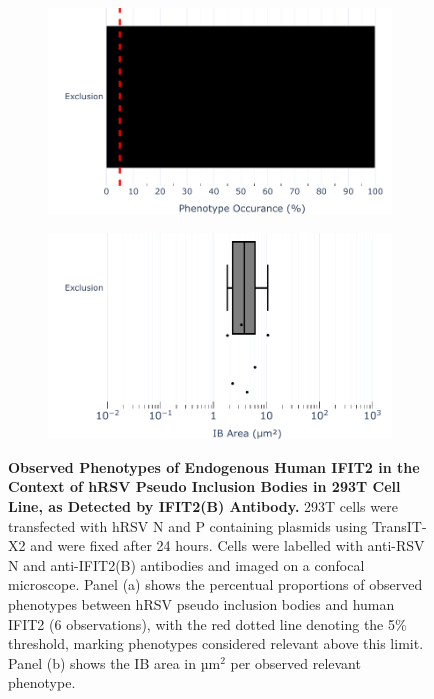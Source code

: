 \begin{figure}
    \begin{subfigure}{0.495\textwidth}
        \caption{}
        \includegraphics[width=1\linewidth]{09. Chapter 4/Figs/01. pIB/03. IFIT2/03. IFIT2B/01. bar_i2b_293t.pdf} 
    \end{subfigure}
    \begin{subfigure}{0.495\textwidth}
        \caption{}
        \includegraphics[width=1\linewidth]{09. Chapter 4/Figs/01. pIB/03. IFIT2/03. IFIT2B/02. box_i2b_293t.pdf}
    \end{subfigure}
    \caption[Observed Phenotypes of Endogenous Human IFIT2 in the Context of hRSV Pseudo Inclusion Bodies in 293T Cell Line, as Detected by IFIT2(B) Antibody.]{\textbf{Observed Phenotypes of Endogenous Human IFIT2 in the Context of hRSV Pseudo Inclusion Bodies in 293T Cell Line, as Detected by IFIT2(B) Antibody.} 293T cells were transfected with hRSV N and P containing plasmids using TransIT-X2 and were fixed after 24 hours. Cells were labelled with anti-RSV N and anti-IFIT2(B) antibodies and imaged on a confocal microscope. Panel (a) shows the percentual proportions of observed phenotypes between hRSV pseudo inclusion bodies and human IFIT2 (6 observations), with the red dotted line denoting the 5\% threshold, marking phenotypes considered relevant above this limit. Panel (b) shows the IB area in \(\mbox{µm}^2\) per observed relevant phenotype.}
    \label{fig:Observed Phenotypes of Endogenous Human IFIT2 in the Context of hRSV Pseudo Inclusion Bodies in 293T Cell Line, as Detected by IFIT2(B) Antibody}
\end{figure}

